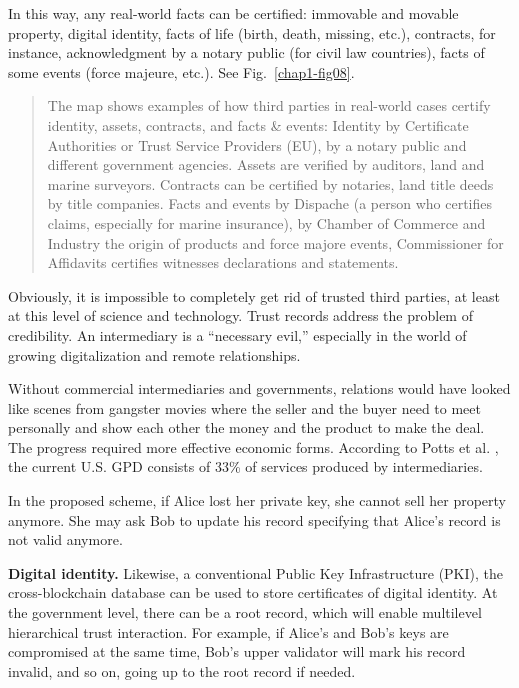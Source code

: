 \begin{multicols}{2}
In this way, any real-world facts can be certified: immovable and movable property, digital identity, facts of life (birth, death, missing, etc.), contracts, for instance, acknowledgment by a notary public (for civil law countries), facts of some events (force majeure, etc.). See Fig.~\ref{chap1-fig08}.
\begin{quote}
The map shows examples of how third parties in real-world cases certify identity, assets, contracts, and facts \& events: Identity by Certificate Authorities or Trust Service Providers (EU), by a notary public and different government agencies. Assets are verified by auditors, land and marine surveyors. Contracts can be certified by notaries, land title deeds by title companies. Facts and events by Dispache (a person who certifies claims, especially for marine insurance), by Chamber of Commerce and Industry the origin of products and force majore events, Commissioner for Affidavits certifies witnesses declarations and statements. 
\end{quote}

Obviously, it is impossible to completely get rid of trusted third parties, at least at this level of science and technology. Trust records address the problem of credibility. An intermediary is a “necessary evil,” especially in the world of growing digitalization and remote relationships.

Without commercial intermediaries and governments, relations would have looked like scenes from gangster movies where the seller and the buyer need to meet personally and show each other the money and the product to make the deal. The progress required more effective economic forms. According to Potts et al. \cite{art1-key42}, the current U.S. GPD consists of 33\% of services produced by intermediaries.

In the proposed scheme, if Alice lost her private key, she cannot sell her property anymore. She may ask Bob to update his record specifying that Alice’s record is not valid anymore.

\textbf{Digital identity.} Likewise, a conventional Public Key Infrastructure (PKI), the cross-blockchain database can be used to store certificates of digital identity. At the government level, there can be a root record, which will enable multilevel hierarchical trust interaction. For example, if Alice’s and Bob’s keys are compromised at the same time, Bob’s upper validator will mark his record invalid, and so on, going up to the root record if needed.


\end{multicols}
